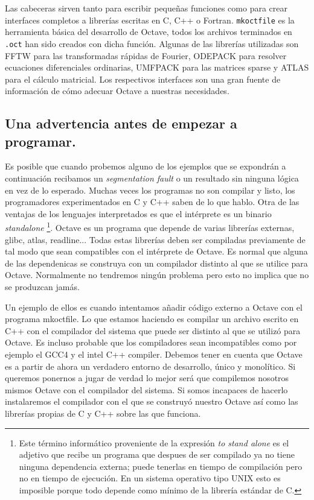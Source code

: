 Las cabeceras sirven tanto para escribir pequeñas funciones como para
crear interfaces completos a librerías escritas en C, C++ o Fortran.
\texttt{mkoctfile} es la herramienta básica del desarrollo de Octave,
todos los archivos terminados en \texttt{.oct} han sido creados con
dicha función. Algunas de las librerías utilizadas son FFTW para las
transformadas rápidas de Fourier, ODEPACK para resolver ecuaciones
diferenciales ordinarias, UMFPACK para las matrices sparse y ATLAS
para el cálculo matricial. Los respectivos interfaces son una gran
fuente de información de cómo adecuar Octave a nuestras necesidades.


\subsection{Una advertencia antes de empezar a programar.}

Es posible que cuando probemos alguno de los ejemplos que se expondrán
a continuación recibamos un \emph{segmentation fault} o un resultado
sin ninguna lógica en vez de lo esperado. Muchas veces los programas
no son compilar y listo, los programadores experimentados en C y C++
saben de lo que hablo. Otra de las ventajas de los lenguajes
interpretados es que el intérprete es un binario \emph{standalone}%
\footnote{Este término informático proveniente de la expresión
  \emph{to stand alone} es el adjetivo que recibe un programa que
  despues de ser compilado ya no tiene ninguna dependencia externa;
  puede tenerlas en tiempo de compilación pero no en tiempo de
  ejecución. En un sistema operativo tipo UNIX esto es imposible
  porque todo depende como mínimo de la librería estándar de C.%
}. Octave es un programa que depende de varias librerías
externas, glibc, atlas, readline... Todas estas librerías deben ser
compiladas previamente de tal modo que sean compatibles con el
intérprete de Octave. Es normal que alguna de las dependenicas se
construya con un compilador distinto al que se utilice para Octave.
Normalmente no tendremos ningún problema pero esto no implica que no
se produzcan jamás.

Un ejemplo de ellos es cuando intentamos añadir código externo a
Octave con el programa mkoctfile. Lo que estamos haciendo es compilar
un archivo escrito en C++ con el compilador del sistema que puede ser
distinto al que se utilizó para Octave. Es incluso probable que los
compiladores sean incompatibles como por ejemplo el GCC4 y el intel
C++ compiler. Debemos tener en cuenta que Octave es a partir de ahora
un verdadero entorno de desarrollo, único y monolítico. Si queremos
ponernos a jugar de verdad lo mejor será que compilemos nosotros
mismos Octave con el compilador del sistema. Si somos incapaces de
hacerlo instalaremos el compilador con el que se construyó nuestro
Octave así como las librerías propias de C y C++ sobre las que
funciona.

